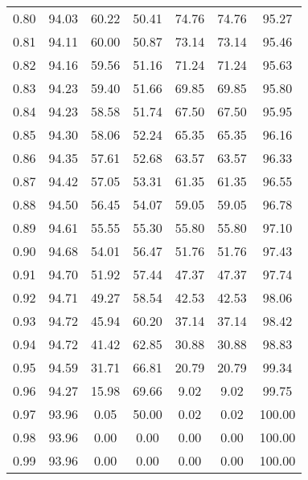 \begin{tabular}{|c|c|c|c|c|c|c|}
      0.80 &     94.03 &     60.22 &      50.41 &   74.76 &      74.76 &         95.27 \\
      0.81 &     94.11 &     60.00 &      50.87 &   73.14 &      73.14 &         95.46 \\
      0.82 &     94.16 &     59.56 &      51.16 &   71.24 &      71.24 &         95.63 \\
      0.83 &     94.23 &     59.40 &      51.66 &   69.85 &      69.85 &         95.80 \\
      0.84 &     94.23 &     58.58 &      51.74 &   67.50 &      67.50 &         95.95 \\
      0.85 &     94.30 &     58.06 &      52.24 &   65.35 &      65.35 &         96.16 \\
      0.86 &     94.35 &     57.61 &      52.68 &   63.57 &      63.57 &         96.33 \\
      0.87 &     94.42 &     57.05 &      53.31 &   61.35 &      61.35 &         96.55 \\
      0.88 &     94.50 &     56.45 &      54.07 &   59.05 &      59.05 &         96.78 \\
      0.89 &     94.61 &     55.55 &      55.30 &   55.80 &      55.80 &         97.10 \\
      0.90 &     94.68 &     54.01 &      56.47 &   51.76 &      51.76 &         97.43 \\
      0.91 &     94.70 &     51.92 &      57.44 &   47.37 &      47.37 &         97.74 \\
      0.92 &     94.71 &     49.27 &      58.54 &   42.53 &      42.53 &         98.06 \\
      0.93 &     94.72 &     45.94 &      60.20 &   37.14 &      37.14 &         98.42 \\
      0.94 &     94.72 &     41.42 &      62.85 &   30.88 &      30.88 &         98.83 \\
      0.95 &     94.59 &     31.71 &      66.81 &   20.79 &      20.79 &         99.34 \\
      0.96 &     94.27 &     15.98 &      69.66 &    9.02 &       9.02 &         99.75 \\
      0.97 &     93.96 &      0.05 &      50.00 &    0.02 &       0.02 &        100.00 \\
      0.98 &     93.96 &      0.00 &       0.00 &    0.00 &       0.00 &        100.00 \\
      0.99 &     93.96 &      0.00 &       0.00 &    0.00 &       0.00 &        100.00 \\
\bottomrule
\end{tabular}
